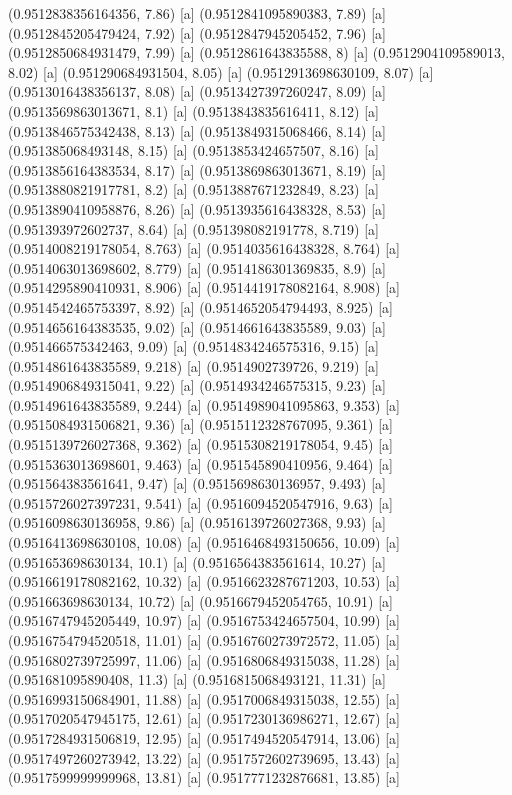 {{{(0.9512838356164356, 7.86) [a] 
(0.9512841095890383, 7.89) [a] 
(0.9512845205479424, 7.92) [a] 
(0.9512847945205452, 7.96) [a] 
(0.9512850684931479, 7.99) [a] 
(0.9512861643835588, 8) [a] 
(0.9512904109589013, 8.02) [a] 
(0.951290684931504, 8.05) [a] 
(0.9512913698630109, 8.07) [a] 
(0.9513016438356137, 8.08) [a] 
(0.9513427397260247, 8.09) [a] 
(0.9513569863013671, 8.1) [a] 
(0.9513843835616411, 8.12) [a] 
(0.9513846575342438, 8.13) [a] 
(0.9513849315068466, 8.14) [a] 
(0.951385068493148, 8.15) [a] 
(0.9513853424657507, 8.16) [a] 
(0.9513856164383534, 8.17) [a] 
(0.9513869863013671, 8.19) [a] 
(0.9513880821917781, 8.2) [a] 
(0.9513887671232849, 8.23) [a] 
(0.9513890410958876, 8.26) [a] 
(0.9513935616438328, 8.53) [a] 
(0.951393972602737, 8.64) [a] 
(0.951398082191778, 8.719) [a] 
(0.9514008219178054, 8.763) [a] 
(0.9514035616438328, 8.764) [a] 
(0.9514063013698602, 8.779) [a] 
(0.9514186301369835, 8.9) [a] 
(0.9514295890410931, 8.906) [a] 
(0.9514419178082164, 8.908) [a] 
(0.9514542465753397, 8.92) [a] 
(0.9514652054794493, 8.925) [a] 
(0.9514656164383535, 9.02) [a] 
(0.9514661643835589, 9.03) [a] 
(0.951466575342463, 9.09) [a] 
(0.9514834246575316, 9.15) [a] 
(0.9514861643835589, 9.218) [a] 
(0.9514902739726, 9.219) [a] 
(0.9514906849315041, 9.22) [a] 
(0.9514934246575315, 9.23) [a] 
(0.9514961643835589, 9.244) [a] 
(0.9514989041095863, 9.353) [a] 
(0.9515084931506821, 9.36) [a] 
(0.9515112328767095, 9.361) [a] 
(0.9515139726027368, 9.362) [a] 
(0.9515308219178054, 9.45) [a] 
(0.9515363013698601, 9.463) [a] 
(0.951545890410956, 9.464) [a] 
(0.951564383561641, 9.47) [a] 
(0.9515698630136957, 9.493) [a] 
(0.9515726027397231, 9.541) [a] 
(0.9516094520547916, 9.63) [a] 
(0.9516098630136958, 9.86) [a] 
(0.9516139726027368, 9.93) [a] 
(0.9516413698630108, 10.08) [a] 
(0.9516468493150656, 10.09) [a] 
(0.951653698630134, 10.1) [a] 
(0.9516564383561614, 10.27) [a] 
(0.9516619178082162, 10.32) [a] 
(0.9516623287671203, 10.53) [a] 
(0.951663698630134, 10.72) [a] 
(0.9516679452054765, 10.91) [a] 
(0.9516747945205449, 10.97) [a] 
(0.9516753424657504, 10.99) [a] 
(0.9516754794520518, 11.01) [a] 
(0.9516760273972572, 11.05) [a] 
(0.9516802739725997, 11.06) [a] 
(0.9516806849315038, 11.28) [a] 
(0.951681095890408, 11.3) [a] 
(0.9516815068493121, 11.31) [a] 
(0.9516993150684901, 11.88) [a] 
(0.9517006849315038, 12.55) [a] 
(0.9517020547945175, 12.61) [a] 
(0.9517230136986271, 12.67) [a] 
(0.9517284931506819, 12.95) [a] 
(0.9517494520547914, 13.06) [a] 
(0.9517497260273942, 13.22) [a] 
(0.9517572602739695, 13.43) [a] 
(0.9517599999999968, 13.81) [a] 
(0.9517771232876681, 13.85) [a] 
}}}
